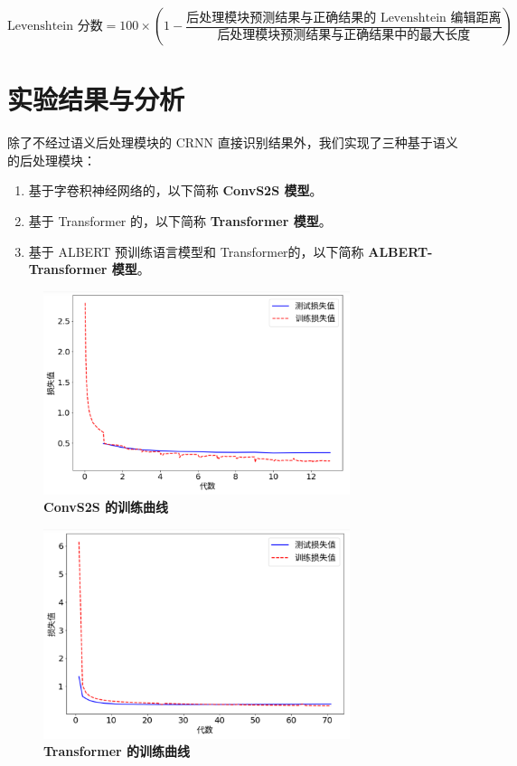 \begin{equation}
	\text{Levenshtein 分数} = 100 \times (1 - \frac{\text{后处理模块预测结果与正确结果的 Levenshtein 编辑距离}}{\text{后处理模块预测结果与正确结果中的最大长度}})
\end{equation}

\section{实验结果与分析}
\label{result}

除了不经过语义后处理模块的 CRNN 直接识别结果外，我们实现了三种基于语义的后处理模块：

\begin{enumerate}[(1)]
	\item 基于字卷积神经网络的，以下简称 \textbf{ConvS2S 模型}。
	\item 基于 Transformer 的，以下简称 \textbf{Transformer 模型}。
	\item 基于 ALBERT 预训练语言模型和 Transformer的，以下简称 \textbf{ALBERT-Transformer 模型}。
\end{enumerate}

\begin{figure}[h!]
	\centering
	\includegraphics[width=0.8\textwidth]{figure/resources/loss_cs2s.png}
	\caption{\textbf{ConvS2S 的训练曲线}\label{loss_cs2s}}
\end{figure}

\begin{figure}[h!]
	\centering
	\includegraphics[width=0.8\textwidth]{figure/resources/loss_transformer.png}
	\caption{\textbf{Transformer 的训练曲线}\label{loss_transformer}}
\end{figure}

